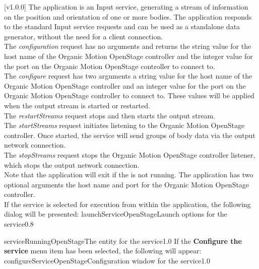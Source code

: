[v1.0.0]
The  application is an Input service,
generating a stream of information on the position and orientation of one or more bodies.
The application responds to the standard Input service requests and can be used as a
standalone data generator, without the need for a client connection.\\

The \emph{configuration} request has no arguments and returns the string value for the
host name of the Organic Motion OpenStage controller and the integer value for the port on
the Organic Motion OpenStage controller to connect to.\\

The \emph{configure} request has two arguments \longDash{} a string value for the host
name of the Organic Motion OpenStage controller and an integer value for the port on the
Organic Motion OpenStage controller to connect to.
These values will be applied when the output stream is started or restarted.\\ 

The \emph{restartStreams} request stops and then starts the output stream.\\

The \emph{startStreams} request initiates listening to the Organic Motion
OpenStage controller.
Once started, the service will send groups of body data via the output \yarp{} network
connection.\\

The \emph{stopStreams} request stops the Organic Motion OpenStage controller listener,
which stops the output \yarp{} network connection.\\ 

Note that the application will exit if the \emph{\RS} is not running.
The application has two optional arguments \longDash{} the host name and port for the
Organic Motion OpenStage controller.
\insertAppParameters
\insertTagDescription{\OSI}
\insertInputServiceComment\\

\insertStandardServiceCommands
\secondaryEnd
\condPage
{}
If the service is selected for execution from within the \emph{\MMMU} application, the
following dialog will be presented:
%
{launchServiceOpenStage}{Launch options for the \emph{\OSI} service}{0.8}

%
{serviceRunningOpenStage}{The \emph{\MMMU} entity for the \emph{\OSI} service}{1.0}
\condPage{}
If the \textbf{Configure the service} menu item has been selected, the following will
appear:
%
{configureServiceOpenStage}{Configuration window for the \emph{\OSI} service}{1.0}
\secondaryEnd
\primaryEnd{}
